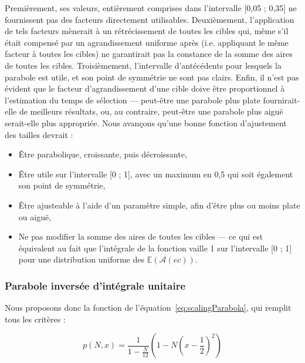	Premièrement, ses valeurs, entièrement comprises dans l'intervalle [0,05 ; 0,35] ne fournissent pas des facteurs directement utilisables. Deuxièmement, l'application de tels facteurs mènerait à un rétrécissement de toutes les cibles qui, même s'il était compensé par un agrandissement uniforme après (i.e. appliquant le même facteur à toutes les cibles) ne garantirait pas la constance de la somme des aires de toutes les cibles. Troisièmement, l'intervalle d'antécédents pour lesquels la parabole est utile, et son point de symmétrie ne sont pas clairs. Enfin, il n'est pas évident que le facteur d'agrandissement d'une cible doive être proportionnel à l'estimation du temps de sélection --- peut-être une parabole plus \og plate \fg{} fournirait-elle de meilleurs résultats, ou, au contraire, peut-être une parabole plus \og aiguë \fg{} serait-elle plus appropriée. Nous avançons qu'une bonne fonction d'ajustement des tailles devrait :
	
	\begin{itemize}
		\item Être parabolique, croissante, puis décroissante,
		\item Être utile sur l'intervalle [0 ; 1], avec un maximum en 0,5 qui soit également son point de symmétrie,
		\item Être ajusteable à l'aide d'un paramètre simple, afin d'être plus ou moins plate ou aiguë,
		\item Ne pas modifier la somme des aires de toutes les cibles --- ce qui est équivalent au fait que l'intégrale de la fonction vaille 1 sur l'intervalle [0 ; 1] pour une distribution uniforme des $\mathbb{E}(\mathcal{A}(ec))$.
	\end{itemize}
	
	\subsubsection{Parabole inversée d'intégrale unitaire}
	Nous proposons donc la fonction de l'équation~\ref{eq:scalingParabola}, qui remplit tous les critères :
	
	\begin{equation}
		p(N,x) = \frac{1}{1-\frac{N}{12}} \left(1-N\left(x-\frac{1}{2}\right)^2\right)
		\label{eq:scalingParabola}
	\end{equation}
	
